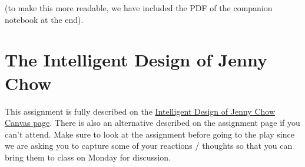 \documentclass[assignment03_Solutions]{subfiles}
\begin{document}
(to make this more readable, we have included the PDF of the companion notebook at the end).

\section{The Intelligent Design of Jenny Chow}

This assignment is fully described on the \href{https://canvas.instructure.com/courses/1659968/assignments/12785465?module_item_id=26196347}{Intelligent Design of Jenny Chow Canvas page}.  There is also an alternative described on the assignment page if you can't attend.  Make sure to look at the assignment before going to the play since we are asking you to capture some of your reactions / thoughts so that you can bring them to class on Monday for discussion.



\end{document}
